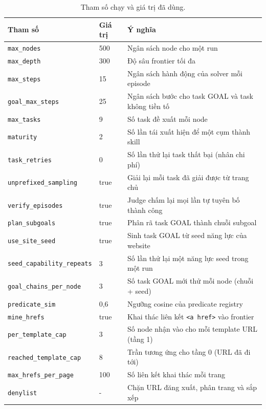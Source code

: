 \begin{table}[H]
\centering
\caption[Tham số chạy]{Tham số chạy và giá trị đã dùng.}
\label{tab:app-params}
\small
\begin{tabular}{@{}L{4.4cm}L{1.4cm}L{7.2cm}@{}}
\toprule
\textbf{Tham số} & \textbf{Giá trị} & \textbf{Ý nghĩa} \\
\midrule
\texttt{max\_nodes}     & 500 & Ngân sách node cho một run \\
\texttt{max\_depth}     & 300 & Độ sâu frontier tối đa \\
\texttt{max\_steps}     & 15  & Ngân sách hành động của solver mỗi episode \\
\texttt{goal\_max\_steps} & 25 & Ngân sách bước cho task GOAL và task không tiền tố \\
\texttt{max\_tasks}     & 9   & Số task đề xuất mỗi node \\
\texttt{maturity}       & 2   & Số lần tái xuất hiện để một cụm thành skill \\
\texttt{task\_retries}  & 0   & Số lần thử lại task thất bại (nhân chi phí) \\
\texttt{unprefixed\_sampling} & true & Giải lại mỗi task đã giải được từ trang chủ \\
\texttt{verify\_episodes} & true & Judge chấm lại mọi lần tự tuyên bố thành công \\
\texttt{plan\_subgoals} & true & Phân rã task GOAL thành chuỗi subgoal \\
\texttt{use\_site\_seed} & true & Sinh task GOAL từ seed năng lực của website \\
\texttt{seed\_capability\_repeats} & 3 & Số lần thử lại một năng lực seed trong một run \\
\texttt{goal\_chains\_per\_node} & 3 & Số task GOAL mới thử mỗi node (chuỗi + seed) \\
\texttt{predicate\_sim} & 0,6 & Ngưỡng cosine của predicate registry \\
\texttt{mine\_hrefs}    & true & Khai thác liên kết \texttt{<a href>} vào frontier \\
\texttt{per\_template\_cap} & 3 & Số node nhận vào cho mỗi template URL (tầng 1) \\
\texttt{reached\_template\_cap} & 8 & Trần tương ứng cho tầng 0 (URL đã đi tới) \\
\texttt{max\_hrefs\_per\_page} & 100 & Số liên kết khai thác mỗi trang \\
\texttt{denylist} & - & Chặn URL đăng xuất, phân trang và sắp xếp \\
\bottomrule
\end{tabular}
\end{table}


